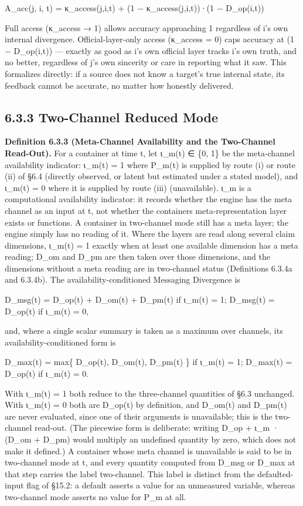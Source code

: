 \documentclass[
]{article}
\begin{document}
A\_acc(j, i, t) = κ\_access(j,i,t) + (1 − κ\_access(j,i,t))·(1 −
D\_op(i,t))

Full access (κ\_access → 1) allows accuracy approaching 1 regardless of
i's own internal divergence. Official-layer-only access (κ\_access = 0)
caps accuracy at (1 − D\_op(i,t)) --- exactly as good as i's own
official layer tracks i's own truth, and no better, regardless of j's
own sincerity or care in reporting what it saw. This formalizes
directly: if a source does not know a target's true internal state, its
feedback cannot be accurate, no matter how honestly delivered.

\hypertarget{two-channel-reduced-mode}{%
\subsection{6.3.3 Two-Channel Reduced
Mode}\label{two-channel-reduced-mode}}

\textbf{Definition 6.3.3 (Meta-Channel Availability and the Two-Channel
Read-Out).} For a container at time t, let ι\_m(t) ∈ \{0, 1\} be the
meta-channel availability indicator: ι\_m(t) = 1 where P\_m(t) is
supplied by route (i) or route (ii) of §6.4 (directly observed, or
latent but estimated under a stated model), and ι\_m(t) = 0 where it is
supplied by route (iii) (unavailable). ι\_m is a computational
availability indicator: it records whether the engine has the meta
channel as an input at t, not whether the container\textquotesingle s
meta-representation layer exists or functions. A container in
two-channel mode still has a meta layer; the engine simply has no
reading of it. Where the layers are read along several claim dimensions,
ι\_m(t) = 1 exactly when at least one available dimension has a meta
reading; D\_om and D\_pm are then taken over those dimensions, and the
dimensions without a meta reading are in two-channel status (Definitions
6.3.4a and 6.3.4b). The availability-conditioned Messaging Divergence is

D\_msg(t) = D\_op(t) + D\_om(t) + D\_pm(t) if ι\_m(t) = 1; D\_msg(t) =
D\_op(t) if ι\_m(t) = 0,

and, where a single scalar summary is taken as a maximum over channels,
its availability-conditioned form is

D\_max(t) = max\{ D\_op(t), D\_om(t), D\_pm(t) \} if ι\_m(t) = 1;
D\_max(t) = D\_op(t) if ι\_m(t) = 0.

With ι\_m(t) = 1 both reduce to the three-channel quantities of §6.3
unchanged. With ι\_m(t) = 0 both are D\_op(t) by definition, and
D\_om(t) and D\_pm(t) are never evaluated, since one of their arguments
is unavailable; this is the two-channel read-out. (The piecewise form is
deliberate: writing D\_op + ι\_m · (D\_om + D\_pm) would multiply an
undefined quantity by zero, which does not make it defined.) A container
whose meta channel is unavailable is said to be in two-channel mode at
t, and every quantity computed from D\_msg or D\_max at that step
carries the label two-channel. This label is distinct from the
defaulted-input flag of §15.2: a default asserts a value for an
unmeasured variable, whereas two-channel mode asserts no value for P\_m
at all.
\end{document}
